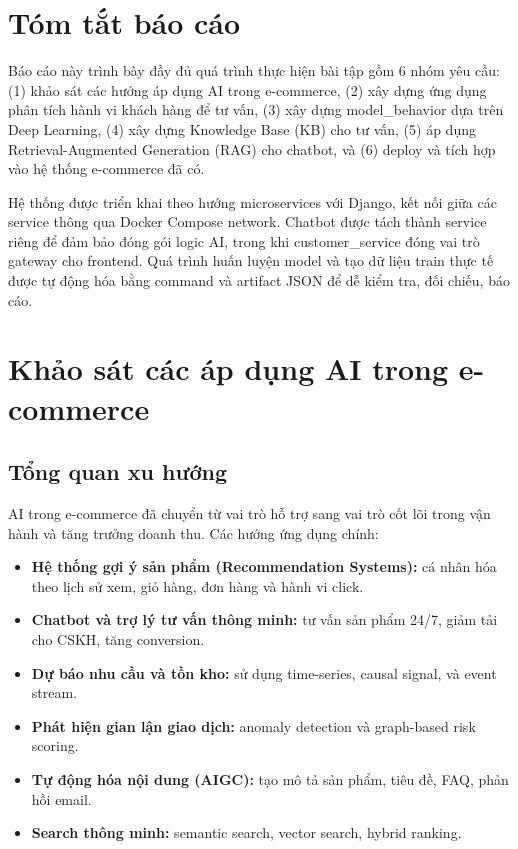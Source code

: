 \documentclass[12pt,a4paper]{article}
\begin{document}
\tableofcontents
\newpage

\section{Tóm tắt báo cáo}
Báo cáo này trình bày đầy đủ quá trình thực hiện bài tập gồm 6 nhóm yêu cầu: (1) khảo sát các hướng áp dụng AI trong e-commerce, (2) xây dựng ứng dụng phân tích hành vi khách hàng để tư vấn, (3) xây dựng model\_behavior dựa trên Deep Learning, (4) xây dựng Knowledge Base (KB) cho tư vấn, (5) áp dụng Retrieval-Augmented Generation (RAG) cho chatbot, và (6) deploy và tích hợp vào hệ thống e-commerce đã có.

Hệ thống được triển khai theo hướng microservices với Django, kết nối giữa các service thông qua Docker Compose network. Chatbot được tách thành service riêng để đảm bảo đóng gói logic AI, trong khi customer\_service đóng vai trò gateway cho frontend. Quá trình huấn luyện model và tạo dữ liệu train thực tế được tự động hóa bằng command và artifact JSON để dễ kiểm tra, đối chiếu, báo cáo.

\section{Khảo sát các áp dụng AI trong e-commerce}

\subsection{Tổng quan xu hướng}
AI trong e-commerce đã chuyển từ vai trò hỗ trợ sang vai trò cốt lõi trong vận hành và tăng trưởng doanh thu. Các hướng ứng dụng chính:
\begin{itemize}
  \item \textbf{Hệ thống gợi ý sản phẩm (Recommendation Systems):} cá nhân hóa theo lịch sử xem, giỏ hàng, đơn hàng và hành vi click.
  \item \textbf{Chatbot và trợ lý tư vấn thông minh:} tư vấn sản phẩm 24/7, giảm tải cho CSKH, tăng conversion.
  \item \textbf{Dự báo nhu cầu và tồn kho:} sử dụng time-series, causal signal, và event stream.
  \item \textbf{Phát hiện gian lận giao dịch:} anomaly detection và graph-based risk scoring.
  \item \textbf{Tự động hóa nội dung (AIGC):} tạo mô tả sản phẩm, tiêu đề, FAQ, phản hồi email.
  \item \textbf{Search thông minh:} semantic search, vector search, hybrid ranking.
\end{itemize}
\end{document}
